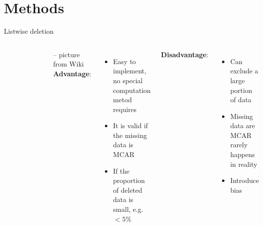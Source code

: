 \documentclass{beamer}
\begin{document}
\section{Methods}
\begin{frame}{Listwise deletion}
\begin{columns}[c] 
	
\begin{figure}[h!]
	\includegraphics[width=\textwidth]{listwise.png}
\end{figure}
-- picture from Wiki
\textbf{Advantage}:\\
\begin{itemize}
\item{Easy to implement, no special computation metod requires}
\item{It is valid if the missing data is MCAR}
\item{If the proportion of deleted data is small, e.g. $<5\%$}
\end{itemize}
\textbf{Disadvantage}:\\
\begin{itemize}
	\item{Can exclude a large portion of data}
	\item{Missing data are MCAR rarely happens in reality}
	\item{Introduce bias}
\end{itemize}
\end{columns}


\end{frame}
\end{document}
